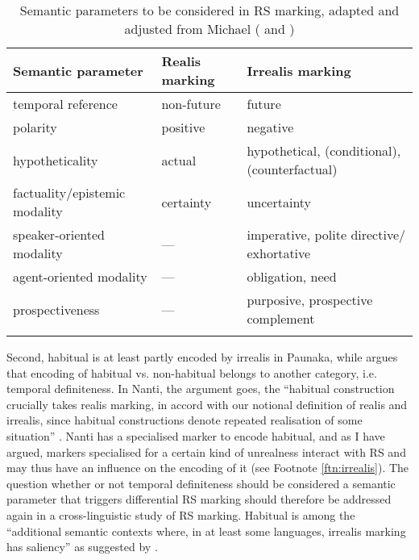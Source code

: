 \begin{table}
\caption[Semantic parameters to be considered in RS marking]{Semantic parameters to be considered in RS marking, adapted and adjusted from Michael (\citeyear[252, 266]{Michael2014} and \citeyear[189]{Michael2014a})}

\begin{tabularx}{\textwidth}{QlQ}
\lsptoprule
Semantic parameter & Realis marking & Irrealis marking \\
\midrule
temporal reference & non-future & future \\
\tablevspace
polarity & positive & negative \\
\tablevspace
hypotheticality & actual & hypothetical, (conditional), (counterfactual) \\
\tablevspace
factuality/epistemic modality & certainty & uncertainty \\
\tablevspace
speaker-oriented modality & --- & imperative, polite directive/ exhortative \\
\tablevspace
agent-oriented modality & --- & obligation, need \\
\tablevspace
prospectiveness & --- & purposive, prospective complement \\
\lspbottomrule
\end{tabularx}

\label{table:Michael_RS_semantics}
\end{table}

\largerpage
Second, habitual is at least partly encoded by irrealis in Paunaka, while \citet[284]{Michael2014} argues that encoding of habitual vs. non-habitual belongs to another category, i.e. temporal definiteness. In Nanti, the argument goes, the “habitual construction crucially takes realis marking, in accord with our notional definition of realis and irrealis, since habitual constructions denote repeated realisation of some situation” \citep[271]{Michael2014}. Nanti has a specialised marker to encode habitual, and as I have argued, markers specialised for a certain kind of unrealness interact with RS and may thus have an influence on the encoding of it (see Footnote \ref{ftn:irrealis}). The question whether or not temporal definiteness should be considered a semantic parameter that triggers differential RS marking should therefore be addressed again in a cross-linguistic study of RS marking. Habitual is among the “additional semantic contexts where, in at least some languages, irrealis marking has saliency” as suggested by \citet[70]{Elliott2000}.

